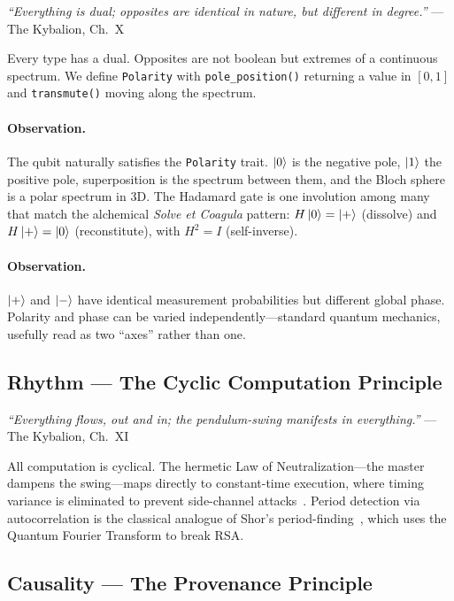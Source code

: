 \documentclass[sigplan,anonymous=false]{acmart}
\begin{document}
\emph{``Everything is dual; opposites are identical in nature, but different in degree.''} --- The Kybalion, Ch.~X

Every type has a dual. Opposites are not boolean but extremes of a continuous spectrum. We define \texttt{Polarity} with \texttt{pole\_position()} returning a value in $[0,1]$ and \texttt{transmute()} moving along the spectrum.

\paragraph{Observation.} The qubit naturally satisfies the \texttt{Polarity} trait. $\ket{0}$ is the negative pole, $\ket{1}$ the positive pole, superposition is the spectrum between them, and the Bloch sphere~\cite{bloch} is a polar spectrum in 3D. The Hadamard gate is one involution among many that match the alchemical \emph{Solve et Coagula} pattern: $H\ket{0} = \ket{+}$ (dissolve) and $H\ket{+} = \ket{0}$ (reconstitute), with $H^2 = I$ (self-inverse).

\paragraph{Observation.} $\ket{+}$ and $\ket{-}$ have identical measurement probabilities but different global phase. Polarity and phase can be varied independently---standard quantum mechanics, usefully read as two ``axes'' rather than one.

\subsection{Rhythm --- The Cyclic Computation Principle}

\emph{``Everything flows, out and in; the pendulum-swing manifests in everything.''} --- The Kybalion, Ch.~XI

All computation is cyclical. The hermetic Law of Neutralization---the master dampens the swing---maps directly to constant-time execution, where timing variance is eliminated to prevent side-channel attacks~\cite{sac}. Period detection via autocorrelation is the classical analogue of Shor's period-finding~\cite{shor}, which uses the Quantum Fourier Transform to break RSA.

\subsection{Causality --- The Provenance Principle}
\end{document}
